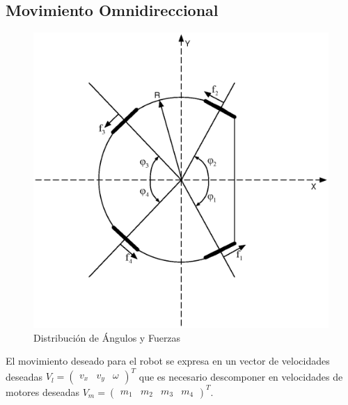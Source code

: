 \documentclass[twocolumn,10pt]{amrob}
\begin{document}
\subsection*{Movimiento Omnidireccional}
\begin{figure}
  \centering
    \includegraphics[scale=0.4]{anglesRobot.eps}
  \caption{Distribución de Ángulos y Fuerzas}
  \label{fig:angFzaDiag}
\end{figure}
El movimiento deseado para el robot se expresa en un vector de velocidades deseadas \( V_l= \begin{pmatrix} v_x & v_y & \omega \end{pmatrix}^{T} \) que es necesario descomponer en velocidades de motores deseadas \( V_m= \begin {pmatrix} m_1 & m_2 & m_3 & m_4 \end{pmatrix}^{T} \). 
\end{document}
